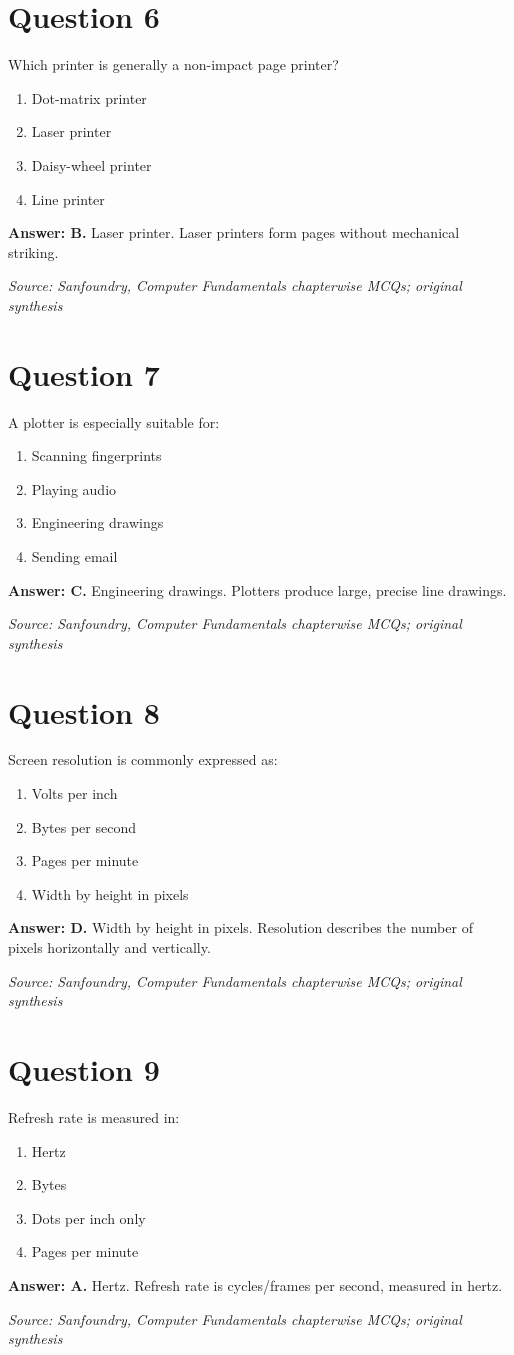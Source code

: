 \documentclass[11pt,a4paper]{book}
\newcommand{\source}[1]{\par\smallskip\textit{Source: #1}}
\newcommand{\answer}[2]{\par\textbf{Answer: #1.} #2}
\begin{document}
\section*{Question 6}
Which printer is generally a non-impact page printer?
\begin{enumerate}[label=\Alph*.]
\item Dot-matrix printer
\item Laser printer
\item Daisy-wheel printer
\item Line printer
\end{enumerate}
\answer{B}{Laser printer. Laser printers form pages without mechanical striking.}
\source{Sanfoundry, Computer Fundamentals chapterwise MCQs; original synthesis}
\section*{Question 7}
A plotter is especially suitable for:
\begin{enumerate}[label=\Alph*.]
\item Scanning fingerprints
\item Playing audio
\item Engineering drawings
\item Sending email
\end{enumerate}
\answer{C}{Engineering drawings. Plotters produce large, precise line drawings.}
\source{Sanfoundry, Computer Fundamentals chapterwise MCQs; original synthesis}
\section*{Question 8}
Screen resolution is commonly expressed as:
\begin{enumerate}[label=\Alph*.]
\item Volts per inch
\item Bytes per second
\item Pages per minute
\item Width by height in pixels
\end{enumerate}
\answer{D}{Width by height in pixels. Resolution describes the number of pixels horizontally and vertically.}
\source{Sanfoundry, Computer Fundamentals chapterwise MCQs; original synthesis}
\section*{Question 9}
Refresh rate is measured in:
\begin{enumerate}[label=\Alph*.]
\item Hertz
\item Bytes
\item Dots per inch only
\item Pages per minute
\end{enumerate}
\answer{A}{Hertz. Refresh rate is cycles/frames per second, measured in hertz.}
\source{Sanfoundry, Computer Fundamentals chapterwise MCQs; original synthesis}
\end{document}
